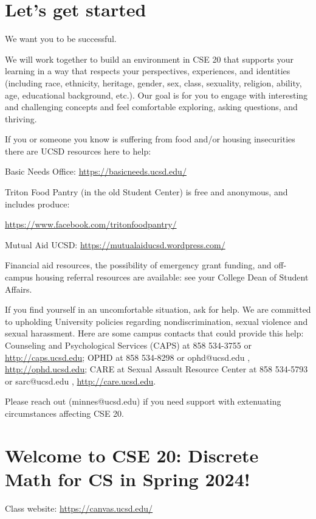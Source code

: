 
\section*{Let's get started}

We want you to be successful. 

We will work together to build an 
environment in CSE 20 that supports your learning
in a way that respects your
perspectives, experiences, and identities (including race, ethnicity, heritage, gender, sex, 
class, sexuality, religion, ability, age, educational background, etc.).
Our goal is for you to  engage
with interesting and challenging concepts and 
feel comfortable exploring, asking questions, and thriving.

If you or someone you know is suffering from food and/or housing insecurities 
there are UCSD resources here to help:

Basic Needs Office: \href{https://basicneeds.ucsd.edu/}{https://basicneeds.ucsd.edu/}

Triton Food Pantry (in the old Student Center)
is free and anonymous, and includes produce: 

\href{https://www.facebook.com/tritonfoodpantry/}{https://www.facebook.com/tritonfoodpantry/}

Mutual Aid UCSD: \href{https://mutualaiducsd.wordpress.com/}{https://mutualaiducsd.wordpress.com/}

Financial aid resources, the possibility of emergency grant funding, and off-campus housing referral 
resources are available: see your College Dean of Student Affairs.

If you find yourself in an uncomfortable situation, ask for help. 
We are committed to upholding University policies regarding nondiscrimination, sexual violence and sexual harassment.
Here are some campus contacts that could provide this help: 
Counseling and Psychological Services (CAPS) at 858 534-3755 or \href{http://caps.ucsd.edu}{http://caps.ucsd.edu}; 
OPHD at 858 534-8298 or ophd@ucsd.edu , \href{http://ophd.ucsd.edu}{http://ophd.ucsd.edu};
CARE at Sexual Assault Resource Center at 858 534-5793 or sarc@ucsd.edu , \href{http://care.ucsd.edu}{http://care.ucsd.edu}.


Please reach out (minnes@ucsd.edu) if you need support with extenuating circumstances affecting CSE 20.

\vfill

\section*{Welcome to CSE 20: Discrete Math for CS in Spring 2024!}
Class website: \href{https://canvas.ucsd.edu//}{https://canvas.ucsd.edu/}



